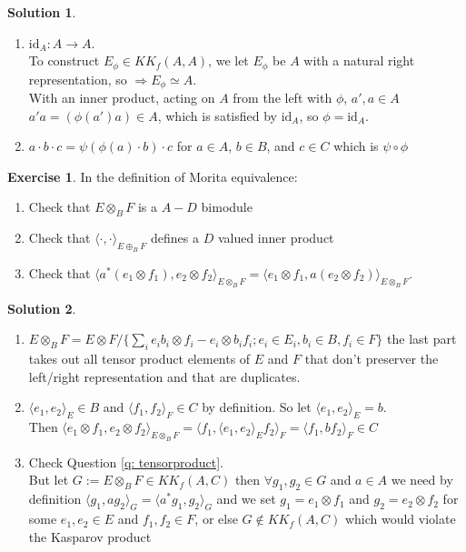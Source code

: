 \documentclass[a4paper]{article}
\theoremstyle{definition}
\theoremstyle{definition}
\theoremstyle{definition}
\theoremstyle{theorem}
\theoremstyle{theorem}
\newtheorem{exercise}{Exercise}
\theoremstyle{theorem}
\theoremstyle{definition}
\newtheorem{solution}{Solution}
\begin{document}
\begin{solution}
    \begin{enumerate}
        \
        \item $\text{id}_A: A \rightarrow A$.\\
            To construct $E_{\phi}\in KK_f(A,A)$, we let $E_{\phi}$ be $A$ with a natural right
            representation, so $\Rightarrow E_{\phi}\simeq A$.\\
            With an inner product, acting on $A$ from the left with $\phi$, $a', a\in A$\\
            $a'a = (\phi(a') a) \in A $, which is satisfied by $\text{id}_A$, so $\phi = \text{id}_A$.
        \item $a \cdot b \cdot c = \psi(\phi(a) \cdot b) \cdot c$ for $a \in A$, $b\in B$, and $c\in C$
                which is $\psi \circ \phi$
    \end{enumerate}
\end{solution}

\begin{exercise}
    In the definition of Morita equivalence:
    \begin{enumerate}
        \item Check that $E \otimes _B F$ is a $A-D$ bimodule
        \item Check that $\langle \cdot,\cdot\rangle _{E\oplus _B F}$ defines a $D$ valued inner product
        \item Check that $\langle a^*(e_1 \otimes f_1), e_2 \otimes f_2\rangle _{E \otimes _B F} = \langle e_1 \otimes f_1, a(e_2 \otimes f_2)\rangle _{E \otimes _B F}$.
    \end{enumerate}
\end{exercise}

\begin{solution}
    \
    \begin{enumerate}
        \item $E \otimes _B F = E \otimes F / \{\sum_i e_i b_i \otimes f_i - e_i \otimes b_i f_i;
            e_i \in E_i, b_i \in B, f_i \in F\}$ the last part takes out all tensor product elements of
            $E$ and $F$ that don't preserver the left/right representation and that are duplicates.
        \item $\langle e_1, e_2\rangle _E \in B$ and $\langle f_1, f_2\rangle _F \in C$ by definition. So let $\langle e_1, e_2\rangle _E =b$. \\
            Then $\langle e_1 \otimes f_1, e_2 \otimes f_2\rangle _{E\otimes _B F} = \langle f_1, \langle e_1, e_2\rangle _E f_2\rangle _F =
            \langle f_1, b f_2\rangle _F \in C$
        \item Check Question \ref{q: tensorproduct}.\\
            But let $G := E\otimes _B F \in KK_f(A,C)$ then $\forall g_1, g_2 \in G$ and $a \in A$ we need
            by definition $\langle g_1, ag_2\rangle _G = \langle a^*g_1, g_2\rangle _G$ and we set $g_1 = e_1 \otimes f_1$ and
            $g_2 = e_2 \otimes f_2$ for some $e_1, e_2 \in E$ and $f_1, f_2 \in F$, or else
            $G \notin KK_f(A,C)$ which would violate the Kasparov product
    \end{enumerate}
\end{solution}
\end{document}
